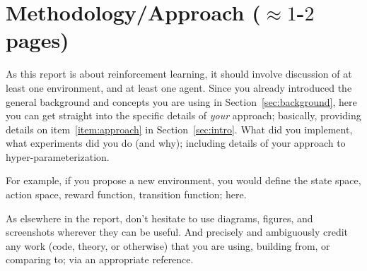 \documentclass[../CSC_52081_EP.tex]{subfiles}
\begin{document}
    \section{Methodology/Approach ($\approx 1$-$2$ pages)}

    As this report is about reinforcement learning, it should involve discussion of at least one environment, and at least one agent. Since you already introduced the general background and concepts you are using in Section~\ref{sec:background}, here you can get straight into the specific details of \emph{your} approach; basically, providing details on item~\ref{item:approach} in Section~\ref{sec:intro}. What did you implement, what experiments did you do (and why); including details of your approach to hyper-parameterization. 

    For example, if you propose a new environment, you would define the state space, action space, reward function, transition function; here.

    As elsewhere in the report, don't hesitate to use diagrams, figures, and screenshots wherever they can be useful. And precisely and ambiguously credit any work (code, theory, or otherwise) that you are using, building from, or comparing to; via an appropriate reference.  
\end{document}
